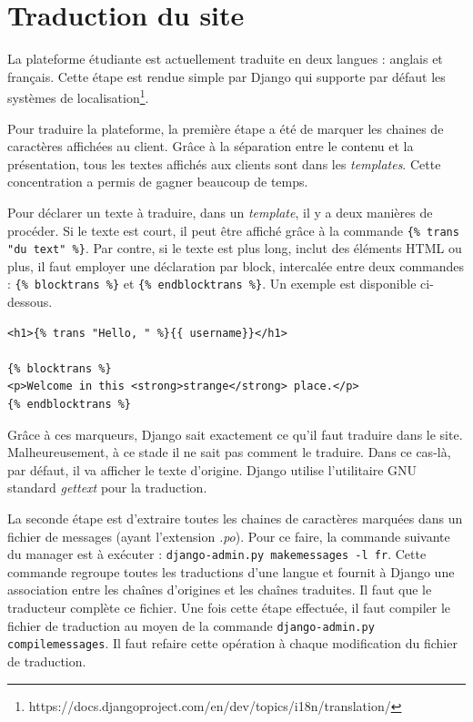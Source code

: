 \documentclass[a4paper,12pt]{article}
\begin{document}
\section{Traduction du site}

La plateforme étudiante est actuellement traduite en deux langues : anglais et français.
Cette étape est rendue simple par Django qui supporte par défaut les systèmes
de localisation\footnote{https://docs.djangoproject.com/en/dev/topics/i18n/translation/}.

Pour traduire la plateforme, la première étape a été de marquer les chaines de
caractères affichées au client. Grâce à la séparation entre le contenu et la présentation,
tous les textes affichés aux clients sont dans les \textit{templates}. Cette concentration
a permis de gagner beaucoup de temps.

Pour déclarer un texte à traduire, dans un \textit{template}, il y a deux manières
de procéder. Si le texte est court, il peut être affiché grâce à la commande 
\texttt{\{\% trans "du text" \%\}}. Par contre, si le texte est plus long, inclut des
éléments HTML ou plus, il faut employer une déclaration par block, intercalée entre
deux commandes : \texttt{\{\% blocktrans \%\}} et \texttt{\{\% endblocktrans \%\}}.
Un exemple est disponible ci-dessous.

\begin{verbatim}
<h1>{% trans "Hello, " %}{{ username}}</h1>

{% blocktrans %}
<p>Welcome in this <strong>strange</strong> place.</p>
{% endblocktrans %}
\end{verbatim}

Grâce à ces marqueurs, Django sait exactement ce qu'il faut traduire dans le site.
Malheureusement, à ce stade il ne sait pas comment le traduire. Dans ce cas-là,
par défaut, il va afficher le texte d'origine. Django utilise l'utilitaire GNU
standard \textit{gettext} pour la traduction.

La seconde étape est d'extraire toutes les chaines de caractères
marquées dans un fichier de messages (ayant l'extension \textit{.po}).
Pour ce faire, la commande suivante du
manager est à exécuter : \texttt{django-admin.py makemessages -l fr}. Cette commande
regroupe toutes les traductions d'une langue et fournit à Django une association
entre les chaînes d'origines et les chaînes traduites. Il faut que le traducteur
complète ce fichier. Une fois cette étape effectuée, il faut compiler
le fichier de traduction au moyen de la commande \texttt{django-admin.py compilemessages}.
Il faut refaire cette opération à chaque modification du fichier de traduction.
\end{document}
